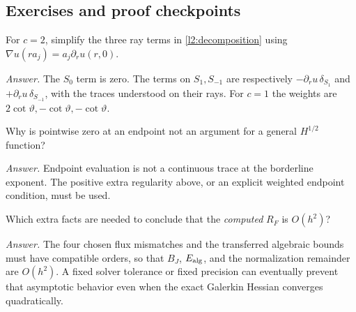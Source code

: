 \subsection*{Exercises and proof checkpoints}
\begin{exercise}
For $c=2$, simplify the three ray terms in \eqref{l2:decomposition} using
$\nabla u(r a_j)=a_j\partial_ru(r,0)$.
\end{exercise}
\noindent\emph{Answer.} The $S_0$ term is zero. The terms on $S_1,S_{-1}$
are respectively $-\partial_ru\,\delta_{S_1}$ and
$+\partial_ru\,\delta_{S_{-1}}$, with the traces understood on their rays.
For $c=1$ the weights are $2\cot\vartheta,-\cot\vartheta,-\cot\vartheta$.

\begin{exercise}
Why is pointwise zero at an endpoint not an argument for a general
$H^{1/2}$ function?
\end{exercise}
\noindent\emph{Answer.} Endpoint evaluation is not a continuous trace
at the borderline exponent. The positive extra regularity above, or an
explicit weighted endpoint condition, must be used.

\begin{exercise}
Which extra facts are needed to conclude that the \emph{computed}
$R_F$ is $O(h^2)$?
\end{exercise}
\noindent\emph{Answer.} The four chosen flux mismatches and the transferred
algebraic bounds must have compatible orders, so that $B_J$, $E_{\rm alg}$,
and the normalization remainder are $O(h^2)$. A fixed solver tolerance or
fixed precision can eventually prevent that asymptotic behavior even when
the exact Galerkin Hessian converges quadratically.
